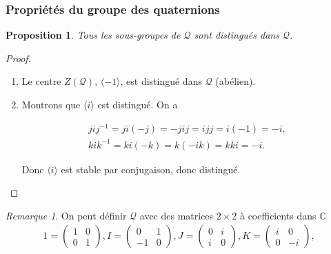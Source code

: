 \documentclass[10pt,notheorems]{beamer}
\theoremstyle{plain}
\theoremstyle{definition}
\theoremstyle{plain}
\newtheorem{prop}{Proposition}
\theoremstyle{plain}
\theoremstyle{plain}
\theoremstyle{remark}
\newtheorem{remark}{Remarque}
\begin{document}
\begin{frame}
  \frametitle{Propriétés du groupe des quaternions}
  \footnotesize
  \begin{prop}
    Tous les sous-groupes de $\mathcal{Q}$ sont distingués dans $\mathcal{Q}$.
  \end{prop}

  \begin{proof}
  \begin{enumerate}
    \item Le centre $Z(\mathcal{Q}) $, $ \langle -1 \rangle  $, est distingué dans $\mathcal{Q}$ (abélien).
    \item Montrons que $\langle i \rangle $ est distingué. On a

    \begin{gather*}
      j i j ^{-1}  = j i (-j) = -jij = ijj = i (-1) = -i , \\
      k i k ^{-1} = k i (-k) = k(-ik) = kki=-i.
    \end{gather*}

    Donc $\langle i \rangle $ est stable par conjugaison, donc distingué.
  \end{enumerate}
  \end{proof}

  \begin{remark} On peut définir $\mathcal{Q}$ avec des matrices $2 \times 2$ à coefficients dans $\mathbb{C}$
    \begin{gather*}
      1 = \begin{pmatrix}
      1 & 0 \\
      0 & 1
    \end{pmatrix}, I = \begin{pmatrix}
      0 & 1 \\
      -1 & 0
    \end{pmatrix}, J = \begin{pmatrix}
      0 & i \\
      i & 0
    \end{pmatrix}, K = \begin{pmatrix}
      i & 0 \\
      0 & -i
    \end{pmatrix},
    \end{gather*}
  \end{remark}
\end{frame}
\end{document}
